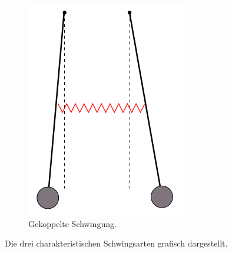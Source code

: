 \begin{figure}[H]
\begin{subfigure}[b]{0.3\textwidth}
		\includegraphics[width=\textwidth]{images/gekoppelte.png}
		\caption{Gekoppelte Schwingung.}
		\label{fig:gekoppelt}
	\end{subfigure}
	\caption{Die drei charakteristischen Schwingsarten grafisch dargestellt.
	\cite{sample}}
	\label{fig:3schwingungen}
\end{figure}

